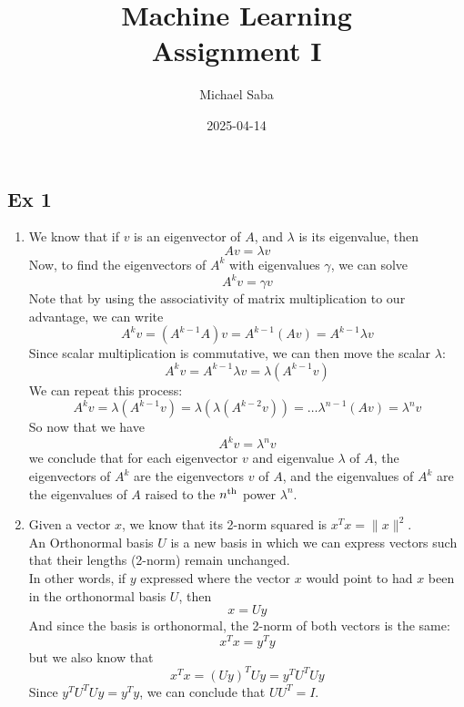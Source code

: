 \documentclass[12pt]{article}
\title{%
    \Huge Machine Learning \\
    \Large Assignment I
}
\date{2025-04-14}
\author{Michael Saba}
\begin{document}
\maketitle
\newpage
\setlength{\parindent}{0pt}

    \subsection*{Ex 1}

    \begin{enumerate}[label=\letters]
        \item 
        We know that if $v$ is an eigenvector of $A$,
        and $\lambda$ is its eigenvalue,
        then
        \[ Av = \lambda v \]
        Now, to find the eigenvectors of $A^k$
        with eigenvalues $\gamma$,
        we can solve
        \[ A^k v = \gamma v \]
        Note that by using the associativity
        of matrix multiplication to our advantage,
        we can write
        \[ A^kv = (A^{k-1}A)v = A^{k-1}(Av) 
        = A^{k-1}\lambda v \]
        Since scalar multiplication
        is commutative, we can then
        move the scalar $\lambda$:
        \[  A^kv = A^{k-1}\lambda v
        = \lambda(A^{k-1} v) \]
        We can repeat this process:
        \[ A^kv = \lambda(A^{k-1} v)
        = \lambda(\lambda(A^{k-2} v))
        = \dots \lambda^{n-1}(Av)
        = \lambda^n v  \]
        So now that we have
        \[ A^kv = \lambda^n v \]
        we conclude that for each eigenvector $v$
        and eigenvalue $\lambda$
        of $A$,
        the eigenvectors of $A^k$
        are the eigenvectors $v$ of $A$,
        and the eigenvalues of $A^k$
        are the eigenvalues of $A$ 
        raised to the $n^{\text{th}}$ power $\lambda^n$.
        \item
        Given a vector $x$,
        we know that its 2-norm squared is
        $x^Tx = \|x\|^2$. \\
        An Orthonormal basis $U$ is a new basis
        in which we can express vectors such that
        their lengths (2-norm) remain unchanged. \\
        In other words,
        if $y$ expressed where the vector $x$ 
        would point to had $x$ been in the
        orthonormal basis $U$, then 
        \[ x = Uy \]
        And since the basis is orthonormal,
        the 2-norm of both vectors is the same:
        \[ x^Tx = y^Ty \]
        but we also know that
        \[ x^Tx = (Uy)^TUy = y^TU^TUy \]
        Since $y^TU^TUy = y^Ty$,
        we can conclude that $UU^T = I$. \\

\end{enumerate}
\end{document}
